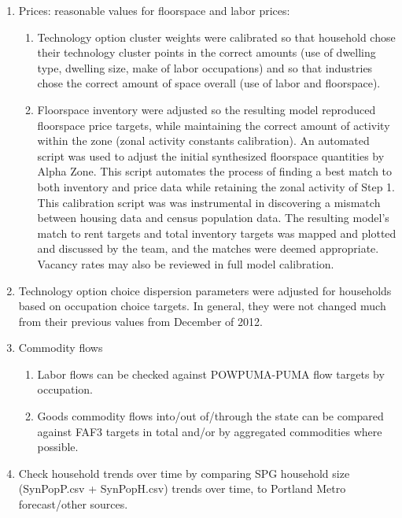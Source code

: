 \begin{enumerate}
\item Prices: reasonable values for floorspace and labor prices:
\begin{enumerate}
\item Technology option cluster weights were calibrated so that household chose their technology cluster points in the correct amounts (use of dwelling type, dwelling size, make of labor occupations) and so that industries chose the correct amount of space overall (use of labor and floorspace).
\item Floorspace inventory were adjusted so the resulting model reproduced floorspace price targets, while maintaining the correct amount of activity within the zone (zonal activity constants calibration). An automated script was used to adjust the initial synthesized floorspace quantities by Alpha Zone. This script automates the process of finding a best match to both inventory and price data while retaining the zonal activity of Step 1. This calibration script was was instrumental in discovering a mismatch between housing data and census population data. The resulting model's match to rent targets and total inventory targets was mapped and plotted and discussed by the team, and the matches were deemed appropriate.  Vacancy rates may also be reviewed in full model calibration.
\end{enumerate}
\item Technology option choice dispersion parameters were adjusted for households based on occupation choice targets. In general, they were not changed much from their previous values from December of 2012.
\item Commodity flows
\begin{enumerate}
\item Labor flows can be checked against POWPUMA-PUMA flow targets by occupation.
\item Goods commodity flows into/out of/through the state can be compared against FAF3 targets in total and/or by aggregated commodities where possible.
\end{enumerate}
\item Check household trends over time by comparing SPG household size (SynPopP.csv + SynPopH.csv) trends over time, to Portland Metro forecast/other sources.
\end{enumerate}

